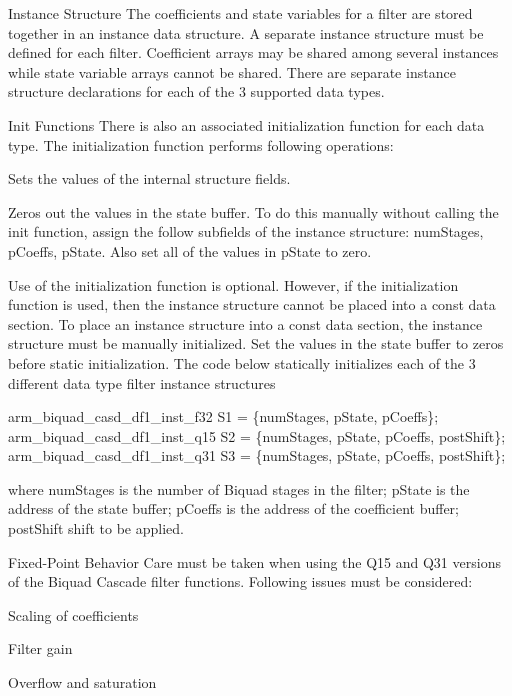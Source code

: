 \begin{DoxyParagraph}{Instance Structure}
The coefficients and state variables for a filter are stored together in an instance data structure. A separate instance structure must be defined for each filter. Coefficient arrays may be shared among several instances while state variable arrays cannot be shared. There are separate instance structure declarations for each of the 3 supported data types.
\end{DoxyParagraph}
\begin{DoxyParagraph}{Init Functions}
There is also an associated initialization function for each data type. The initialization function performs following operations\+:
\begin{DoxyItemize}
\item Sets the values of the internal structure fields.
\item Zeros out the values in the state buffer. To do this manually without calling the init function, assign the follow subfields of the instance structure\+: num\+Stages, p\+Coeffs, p\+State. Also set all of the values in p\+State to zero.
\end{DoxyItemize}
\end{DoxyParagraph}
\begin{DoxyParagraph}{}
Use of the initialization function is optional. However, if the initialization function is used, then the instance structure cannot be placed into a const data section. To place an instance structure into a const data section, the instance structure must be manually initialized. Set the values in the state buffer to zeros before static initialization. The code below statically initializes each of the 3 different data type filter instance structures 
\begin{DoxyPre}
    arm\_biquad\_casd\_df1\_inst\_f32 S1 = \{numStages, pState, pCoeffs\};
    arm\_biquad\_casd\_df1\_inst\_q15 S2 = \{numStages, pState, pCoeffs, postShift\};
    arm\_biquad\_casd\_df1\_inst\_q31 S3 = \{numStages, pState, pCoeffs, postShift\};
\end{DoxyPre}
 where {\ttfamily num\+Stages} is the number of Biquad stages in the filter; {\ttfamily p\+State} is the address of the state buffer; {\ttfamily p\+Coeffs} is the address of the coefficient buffer; {\ttfamily post\+Shift} shift to be applied.
\end{DoxyParagraph}
\begin{DoxyParagraph}{Fixed-\/\+Point Behavior}
Care must be taken when using the Q15 and Q31 versions of the Biquad Cascade filter functions. Following issues must be considered\+:
\begin{DoxyItemize}
\item Scaling of coefficients
\item Filter gain
\item Overflow and saturation
\end{DoxyItemize}
\end{DoxyParagraph}
